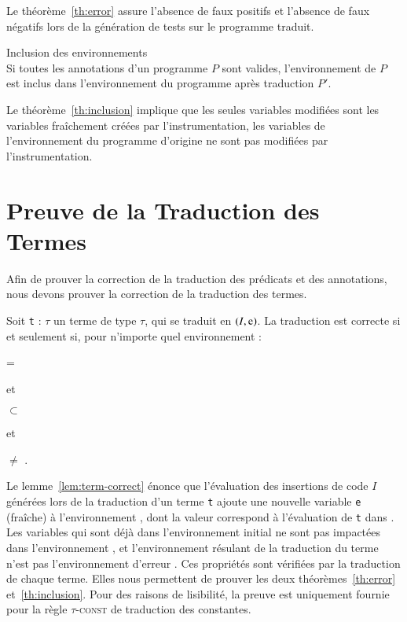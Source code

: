 Le théorème~\ref{th:error} assure l'absence de faux positifs et l'absence de
faux négatifs lors de la génération de tests sur le programme traduit.


\begin{theorem}{Inclusion des environnements}\label{th:inclusion}~\\
  Si toutes les annotations d'un programme $P$ sont valides, l'environnement de
  $P$ est inclus dans l'environnement du programme après traduction $P'$.
\end{theorem}

Le théorème~\ref{th:inclusion} implique que les seules variables modifiées sont
les variables fraîchement créées par l'instrumentation, les variables de
l'environnement du programme d'origine ne sont pas modifiées par
l'instrumentation.


\section{Preuve de la Traduction des Termes}
\label{sec:term-translation}

Afin de prouver la correction de la traduction des prédicats et des annotations,
nous devons prouver la correction de la traduction des termes.

\begin{lemma}
  \label{lem:term-correct}
  Soit \lstinline't' : $\tau$ un terme de type $\tau$, qui se traduit en
  $(I, \mbox{\lstinline'e'})$.
  La traduction est correcte si et seulement si, pour n'importe quel
  environnement \env :
  
   = 
  
  et
  
  \env $\subset$ 

  et

   $\neq$ \errorenv.
\end{lemma}

Le lemme~\ref{lem:term-correct} énonce que l'évaluation des insertions de code
$I$ générées lors de la traduction d'un terme \lstinline't' ajoute une nouvelle
variable \lstinline'e' (fraîche) à l'environnement \env, dont la valeur
correspond à l'évaluation de \lstinline't' dans \env.
Les variables qui sont déjà dans l'environnement initial \env ne sont pas
impactées dans l'environnement , et l'environnement résulant
de la traduction du terme n'est pas l'environnement d'erreur \errorenv.
Ces propriétés sont vérifiées par la traduction de chaque terme.
Elles nous permettent de prouver les deux théorèmes~\ref{th:error}
et~\ref{th:inclusion}.
Pour des raisons de lisibilité, la preuve est uniquement fournie pour la règle
\textsc{$\tau$-const} de traduction des constantes.





